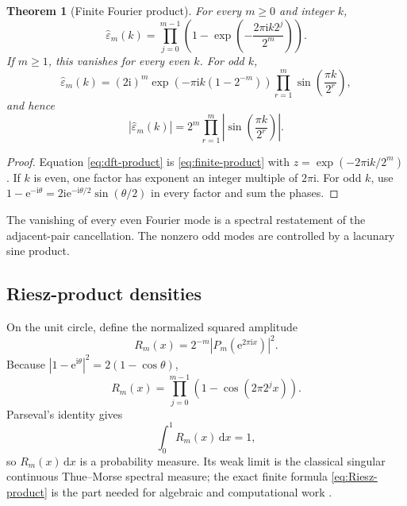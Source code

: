 \documentclass[11pt,oneside]{article}
\newtheorem{theorem}{Theorem}[section]
\theoremstyle{definition}
\theoremstyle{remark}
\newcommand{\e}{\mathrm e}
\newcommand{\ii}{\mathrm i}
\newcommand{\dd}{\,\mathrm d}
\begin{document}
\begin{theorem}[Finite Fourier product]
\label{thm:finite-fourier}
For every \(m\ge0\) and integer \(k\),
\begin{equation}
 \widehat\varepsilon_m(k)
 =\prod_{j=0}^{m-1}
  \left(1-\exp\!\left(-\frac{2\pi\ii k2^j}{2^m}\right)\right).
 \label{eq:dft-product}
\end{equation}
If \(m\ge1\), this vanishes for every even \(k\).  For odd \(k\),
\begin{equation}
 \widehat\varepsilon_m(k)
 =(2\ii)^m\exp\!\left(-\pi\ii k(1-2^{-m})\right)
 \prod_{r=1}^m\sin\!\left(\frac{\pi k}{2^r}\right),
 \label{eq:dft-sine}
\end{equation}
and hence
\begin{equation}
 \left|\widehat\varepsilon_m(k)\right|
 =2^m\prod_{r=1}^m
   \left|\sin\!\left(\frac{\pi k}{2^r}\right)\right|.
 \label{eq:dft-magnitude}
\end{equation}
\end{theorem}

\begin{proof}
Equation \eqref{eq:dft-product} is \eqref{eq:finite-product} with
\(z=\exp(-2\pi\ii k/2^m)\).  If \(k\) is even, one factor has exponent an
integer multiple of \(2\pi\ii\).  For odd \(k\), use
\(1-\e^{-\ii\theta}=2\ii\e^{-\ii\theta/2}\sin(\theta/2)\) in every factor
and sum the phases.
\end{proof}

The vanishing of every even Fourier mode is a spectral restatement of the
adjacent-pair cancellation.  The nonzero odd modes are controlled by a
lacunary sine product.

\subsection{Riesz-product densities}

On the unit circle, define the normalized squared amplitude
\begin{equation}
 R_m(x)=2^{-m}\left|P_m(\e^{2\pi\ii x})\right|^2.
 \label{eq:Riesz-def}
\end{equation}
Because \(|1-\e^{\ii\theta}|^2=2(1-\cos\theta)\),
\begin{equation}
 \boxed{\quad
 R_m(x)=\prod_{j=0}^{m-1}
       \left(1-\cos(2\pi2^jx)\right).
 \quad}
 \label{eq:Riesz-product}
\end{equation}
Parseval's identity gives
\begin{equation}
 \int_0^1R_m(x)\dd x=1,
 \label{eq:Riesz-mass}
\end{equation}
so \(R_m(x)\dd x\) is a probability measure.  Its weak limit is the classical
singular continuous Thue--Morse spectral measure; the exact finite formula
\eqref{eq:Riesz-product} is the part needed for algebraic and computational
work \cite{queffelec2010}.
\end{document}

